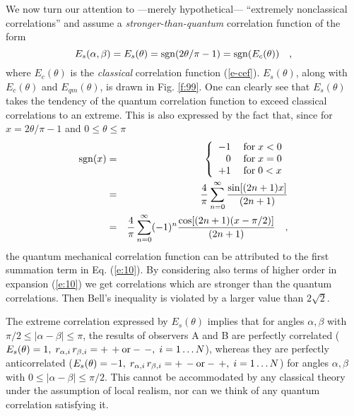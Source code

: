 We now turn our attention to ---merely hypothetical---
``extremely nonclassical correlations''
and assume a
{\em stronger-than-quantum} correlation function of the form
\begin{equation}
E_s(\alpha,\beta) = E_s(\theta) = {\rm sgn} (2\theta / \pi -1) =
{\rm sgn} (E_c(\theta ))
\quad ,
\label{e:7}
\end{equation}
where $E_c(\theta)$ is the {\em classical} correlation function
(\ref{e-cef}).
$E_s(\theta )$, along with $E_c(\theta )$ and $E_{qm}(\theta )$,
is drawn in Fig. \ref{f:99}. One can clearly see that $E_s(\theta)$ takes
the tendency of the quantum correlation function to exceed classical
correlations to an extreme.
This is also expressed by the fact that,
since for $x = 2\theta / \pi -1$ and $0 \leq \theta \leq \pi $
\begin{eqnarray}
{\rm sgn} (x)
&=&\left\{ \begin{array}{rl}
-1 \; &{\rm  for}\; x<0 \\
 0 \; &{\rm  for}\; x=0 \\
+1 \; &{\rm  for}\; 0< x
   \end{array} \right. \nonumber \\
&=&{4\over \pi }\sum_{n=0}^\infty {\sin [
(2n+1)x]\over
(2n+1)}
\nonumber
\\
&=&{4\over \pi }\sum_{n=0}^\infty (-1)^n{\cos [
(2n+1)(x-\pi /2)]\over
(2n+1)}\quad ,
\label{e:10}
\end{eqnarray}
the quantum mechanical correlation function can be attributed to the first
summation term in Eq. (\ref{e:10}). By considering also
terms of higher order in expansion (\ref{e:10}) we get correlations which
are stronger than the quantum correlations. Then Bell\rq s inequality is
violated by a larger value than $2\sqrt{2}$.

The extreme correlation expressed by $E_s(\theta)$ implies that for angles
$\alpha , \beta$ with $\pi /2 \leq \vert\alpha - \beta\vert \leq \pi$,
the results of observers A and B are
perfectly correlated ($E_s(\theta) = 1 ,\;
r_{\alpha,i}\,r_{\beta,i} = +\,+ {\rm or} -\,- ,\;
i=1 \dots N$),
whereas they are perfectly
anticorrelated ($ E_s(\theta) = -1 ,\;
r_{\alpha,i}\,r_{\beta,i} = +\,- {\rm or} -\,+ ,\;
i=1 \dots N$) for
angles $\alpha , \beta$ with $0 \leq \mid\alpha - \beta\mid \leq \pi /2$.
This cannot be accommodated by any classical theory under the assumption of
local realism, nor can we think of any quantum correlation satisfying it.

